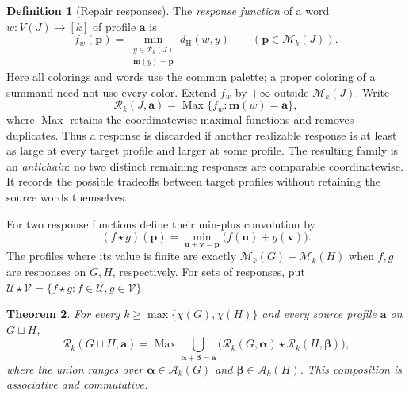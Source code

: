 \documentclass[11pt,reqno]{amsart}
\numberwithin{equation}{section}
\newtheorem{theorem}{Theorem}[section]
\theoremstyle{definition}
\newtheorem{definition}[theorem]{Definition}
\theoremstyle{remark}
\begin{document}
\begin{definition}[Repair responses]\label{def:responses}
The \emph{response function} of a word $w:V(J)\to[k]$ of profile
$\mathbf a$ is
\[
 f_w(\mathbf p)=
 \min_{\substack{y\in\mathcal P_k(J)\\\mathbf m(y)=\mathbf p}}
       d_{\mathrm H}(w,y)
 \qquad(\mathbf p\in\mathcal M_k(J)).
\]
Here all colorings and words use the common palette; a proper coloring
of a summand need not use every color. Extend $f_w$ by $+\infty$
outside $\mathcal M_k(J)$. Write
\[
 \mathcal R_k(J,\mathbf a)
 =\operatorname{Max}\{f_w:\mathbf m(w)=\mathbf a\},
\]
where $\operatorname{Max}$ retains the coordinatewise maximal
functions and removes duplicates. Thus a response is discarded if
another realizable response is at least as large at every target
profile and larger at some profile. The resulting family is an
\emph{antichain}: no two distinct remaining responses are comparable
coordinatewise. It records the possible tradeoffs between target
profiles without retaining the source words themselves.

For two response functions define their min-plus convolution by
\[
 (f\star g)(\mathbf p)
 =\min_{\mathbf u+\mathbf v=\mathbf p}
       \bigl(f(\mathbf u)+g(\mathbf v)\bigr).
\]
The profiles where its value is finite are exactly
$\mathcal M_k(G)+\mathcal M_k(H)$ when $f,g$ are responses on
$G,H$, respectively. For sets of responses, put
$\mathcal U\star\mathcal V=\{f\star g:f\in\mathcal U,
g\in\mathcal V\}$.
\end{definition}

\begin{theorem}\label{union:ordinary-composition}
For every $k\ge\max\{\chi(G),\chi(H)\}$ and every source profile
$\mathbf a$ on $G\sqcup H$,
\begin{equation}\label{union:frontier-composition}
\mathcal R_k(G\sqcup H,\mathbf a)
=\operatorname{Max}
\bigcup_{\boldsymbol\alpha+\boldsymbol\beta=\mathbf a}
\bigl(\mathcal R_k(G,\boldsymbol\alpha)
      \star\mathcal R_k(H,\boldsymbol\beta)\bigr),
\end{equation}
where the union ranges over
$\boldsymbol\alpha\in\mathcal A_k(G)$ and
$\boldsymbol\beta\in\mathcal A_k(H)$.
This composition is associative and commutative.
\end{theorem}
\end{document}
